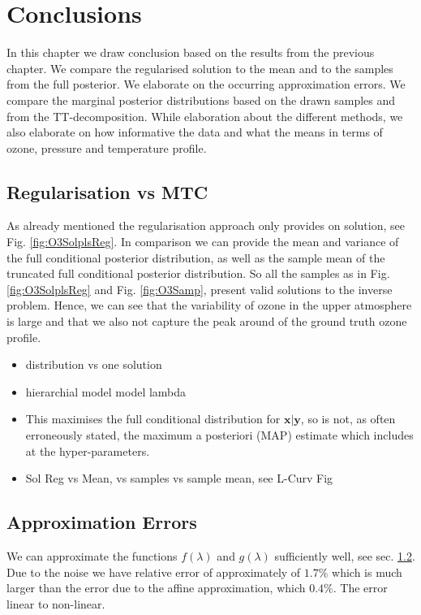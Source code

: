 \chapter{Conclusions}
\label{ch:Concl}
In this chapter we draw conclusion based on the results from the previous chapter.
We compare the regularised solution to the mean and to the samples from the full posterior.
We elaborate on the occurring approximation errors.
We compare the marginal posterior distributions based on the drawn samples and from the TT-decomposition.
While elaboration about the different methods, we also elaborate on how informative the data and what the means in terms of ozone, pressure and temperature profile. 


\section{Regularisation vs MTC}
As already mentioned the regularisation approach only provides on solution, see Fig. \ref{fig:O3SolplsReg}.
In comparison we can provide the mean and variance of the full conditional posterior distribution, as well as the sample mean of the truncated full conditional posterior distribution.
So all the samples as in Fig. \ref{fig:O3SolplsReg} and Fig. \ref{fig:O3Samp}, present valid solutions to the inverse problem.
Hence, we can see that the variability of ozone in the upper atmosphere is large and that we also not capture the peak around of the ground truth ozone profile.
\begin{itemize}
	\item distribution vs one solution
	\item hierarchial model model lambda
	\item This maximises the full conditional distribution for $\bm{x}|\bm{y}$, so is not, as often erroneously stated, the maximum a posteriori (MAP) estimate which includes at the hyper-parameters.
	\item Sol Reg vs Mean, vs samples vs sample mean, see L-Curv Fig
\end{itemize}

\section{Approximation Errors}

We can approximate the functions $f(\lambda)$ and $g(\lambda)$ sufficiently well, see sec. \ref{}.
Due to the noise we have relative error of approximately of $1.7 \%$ which is much larger than the error due to the affine approximation, which $0.4 \%$.
The error linear to non-linear.

